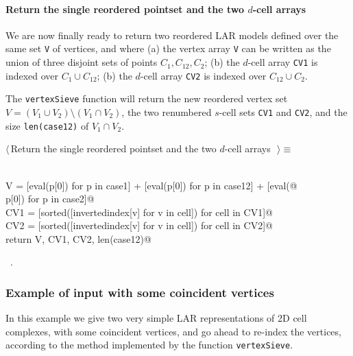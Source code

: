 \documentclass[11pt,oneside]{article}	%
\begin{document}
\paragraph{Return the single reordered pointset and the two $d$-cell arrays}
We are now finally ready to return two reordered LAR models defined over the same set \texttt{V} of vertices, and where (a) the vertex array \texttt{V} can be written as the union of three disjoint sets of points $C_1,C_{12},C_2$; (b) the $d$-cell array \texttt{CV1} is indexed over $C_1\cup C_{12}$; (b) the $d$-cell array \texttt{CV2} is indexed over $C_{12}\cup C_{2}$. 

The \texttt{vertexSieve} function will return the new reordered vertex set $V = (V_1 \cup V_2) \setminus (V_1 \cap V_2)$, the two renumbered $s$-cell sets \texttt{CV1} and \texttt{CV2}, and the size \texttt{len(case12)} of $V_1 \cap V_2$.
\begin{flushleft} \small \label{scrap7}
$\langle\,$Return the single reordered pointset and the two $d$-cell arrays\nobreak\ {\footnotesize {}}$\,\rangle\equiv$
\vspace{-1ex}
\begin{list}{}{} \item
\mbox{}\verb@@\\
\mbox{}\verb@   V = [eval(p[0]) for p in case1] + [eval(p[0]) for p in case12] + [eval(@\\
\mbox{}\verb@            p[0]) for p in case2]@\\
\mbox{}\verb@   CV1 = [sorted([invertedindex[v] for v in cell]) for cell in CV1]@\\
\mbox{}\verb@   CV2 = [sorted([invertedindex[v] for v in cell]) for cell in CV2]@\\
\mbox{}\verb@   return V, CV1, CV2, len(case12)@\\
\mbox{}\verb@@{\NWsep}
\end{list}
\vspace{-1ex}
\footnotesize\addtolength{\baselineskip}{-1ex}
\begin{list}{}{\setlength{\itemsep}{-\parsep}\setlength{\itemindent}{-\leftmargin}}
\item \NWtxtMacroRefIn\ .
\end{list}
\end{flushleft}


\subsubsection{Example of input with some coincident vertices}
In this example we give two very simple LAR representations of 2D cell complexes, with some coincident vertices, and go ahead to re-index the vertices, according to the method implemented by the function \texttt{vertexSieve}.
\end{document}
